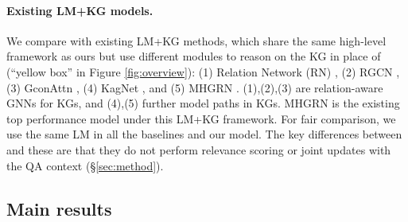 \paragraph{Existing LM+KG models.}
We compare with existing LM+KG methods, which share the same high-level framework as ours but use different modules to reason on the KG in place of \methodname (``yellow box'' in Figure\! \ref{fig:overview}):
(1) Relation Network (RN) \cite{santoro2017simple}, (2) RGCN \cite{schlichtkrull2018modeling}, (3) GconAttn \cite{wang2019improving}, (4) KagNet \cite{lin2019kagnet}, and (5) MHGRN \cite{feng2020scalable}.
(1),(2),(3) are relation-aware GNNs for KGs, and (4),(5) further model paths in KGs. MHGRN is the existing top performance model under this LM+KG framework.
For fair comparison, we use the same LM in all the baselines and our model.
The key differences between \methodname and these are that they do not perform {relevance scoring} or {joint updates} with the QA context (\S \ref{sec:method}).


\subsection{Main results}
\begin{table}[t]
\centering
{}
\vspace{-2mm}
\caption{\textbf{Performance comparison on \textit{Commonsense \!QA} in-house split} (controlled experiments). 
As the official test is hidden, here we report the in-house Dev (IHdev) and Test (IHtest) accuracy, following the data split of \citet{lin2019kagnet}.
}
\label{tab:csqa_main}
\end{table}

